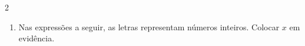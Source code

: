 \documentclass[a4paper,14pt]{article}
\begin{document}
\begin{multicols}{2}
\begin{enumerate}
\begin{enumerate}[a)]
    			\item $x(x + 4)$ \\\\\\\\
    			\item $y(2 + a - b)$ \\\\\\\\
    			\item $y(y^2 - 6y + 4)$ \\\\\\\\
    			\item $a(x - 3y + 7z)$ \\\\\\\\
    			\item $-8(a - 1)$ \\\\\\\\
    			\item $-6(x + 5)$ \\\\\\\\
    			\item $3(8 - y)$ \\\\\\\\
    			\item $-1(3x - x^2)$ \\\\\\\\
    			\item $-6(x - 5x)$ \\\\\\\\
    			\item $2(3x^2 - 5x + 4)$ \\\\\\\\
    		\end{enumerate}
    		\item Nas expressões a seguir, as letras representam números inteiros. Colocar $x$ em evidência.
    		\begin{enumerate}[a)]

\end{enumerate}
\end{enumerate}
\end{multicols}
\end{document}

